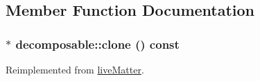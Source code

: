 \subsection{Member Function Documentation}
\hypertarget{classdecomposable_ab15f1f4e93e58810887029648be0ec31}{
\subsubsection[{clone}]{ $\ast$ decomposable::clone () const}}
\label{classdecomposable_ab15f1f4e93e58810887029648be0ec31}


Reimplemented from \hyperlink{classlive_matter_a08101ef64ee3eeec55d222bb75975370}{liveMatter}.

